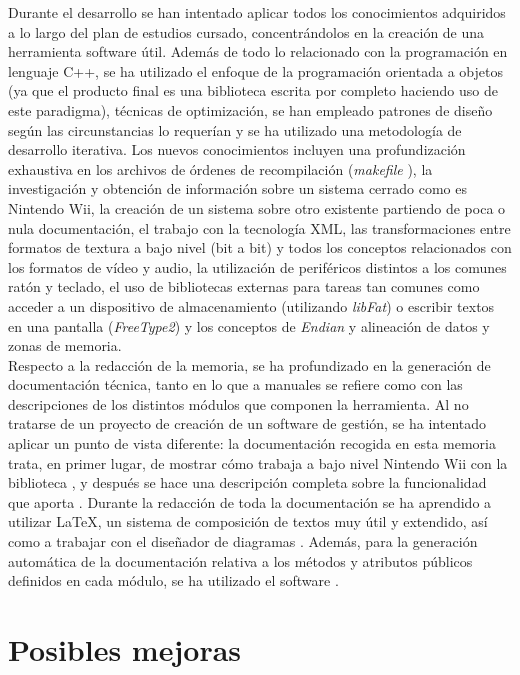 Durante el desarrollo se han intentado aplicar todos los conocimientos adquiridos a lo largo del plan de estudios cursado, concentrándolos en la creación de una herramienta software útil. Además de todo lo relacionado con la programación en lenguaje C++, se ha utilizado el enfoque de la programación orientada a objetos (ya que el producto final es una biblioteca escrita por completo haciendo uso de este paradigma), técnicas de optimización, se han empleado patrones de diseño según las circunstancias lo requerían y se ha utilizado una metodología de desarrollo iterativa. Los nuevos conocimientos incluyen una profundización exhaustiva en los archivos de órdenes de recompilación (\emph{makefile} \cite{website:make}), la investigación y obtención de información sobre un sistema cerrado como es Nintendo Wii, la creación de un sistema sobre otro existente partiendo de poca o nula documentación, el trabajo con la tecnología XML, las transformaciones entre formatos de textura a bajo nivel (bit a bit) y todos los conceptos relacionados con los formatos de vídeo y audio, la utilización de periféricos distintos a los comunes ratón y teclado, el uso de bibliotecas externas para tareas tan comunes como acceder a un dispositivo de almacenamiento (utilizando \emph{libFat}) o escribir textos en una pantalla (\emph{FreeType2}) y los conceptos de \emph{Endian} y alineación de datos y zonas de memoria.\\

Respecto a la redacción de la memoria, se ha profundizado en la generación de documentación técnica, tanto en lo que a manuales se refiere como con las descripciones de los distintos módulos que componen la herramienta. Al no tratarse de un proyecto de creación de un software de gestión, se ha intentado aplicar un punto de vista diferente: la documentación recogida en esta memoria trata, en primer lugar, de mostrar cómo trabaja a bajo nivel Nintendo Wii con la biblioteca  \cite{website:libogc}, y después se hace una descripción completa sobre la funcionalidad que aporta . Durante la redacción de toda la documentación se ha aprendido a utilizar \LaTeX, un sistema de composición de textos muy útil y extendido, así como a trabajar con el diseñador de diagramas . Además, para la generación automática de la documentación relativa a los métodos y atributos públicos definidos en cada módulo, se ha utilizado el software  \cite{website:doxygen}.

\section{Posibles mejoras}

